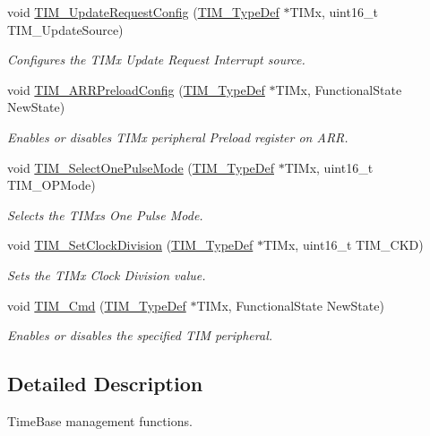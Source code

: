 \begin{DoxyCompactItemize}
void \hyperlink{group___t_i_m___group1_ga1d7a8f952e209de142499e67a653fc1f}{T\+I\+M\+\_\+\+Update\+Request\+Config} (\hyperlink{struct_t_i_m___type_def}{T\+I\+M\+\_\+\+Type\+Def} $\ast$T\+I\+Mx, uint16\+\_\+t T\+I\+M\+\_\+\+Update\+Source)
\begin{DoxyCompactList}\small\item\em Configures the T\+I\+Mx Update Request Interrupt source. \end{DoxyCompactList}\item 
void \hyperlink{group___t_i_m___group1_ga42b44b9fc2b0798d733720dd6bac1ac0}{T\+I\+M\+\_\+\+A\+R\+R\+Preload\+Config} (\hyperlink{struct_t_i_m___type_def}{T\+I\+M\+\_\+\+Type\+Def} $\ast$T\+I\+Mx, Functional\+State New\+State)
\begin{DoxyCompactList}\small\item\em Enables or disables T\+I\+Mx peripheral Preload register on A\+RR. \end{DoxyCompactList}\item 
void \hyperlink{group___t_i_m___group1_gadd2cca5fac6c1291dc4339098d5c9562}{T\+I\+M\+\_\+\+Select\+One\+Pulse\+Mode} (\hyperlink{struct_t_i_m___type_def}{T\+I\+M\+\_\+\+Type\+Def} $\ast$T\+I\+Mx, uint16\+\_\+t T\+I\+M\+\_\+\+O\+P\+Mode)
\begin{DoxyCompactList}\small\item\em Selects the T\+I\+Mx\textquotesingle{}s One Pulse Mode. \end{DoxyCompactList}\item 
void \hyperlink{group___t_i_m___group1_ga20ef804dc32c723662d11ee7da3baab2}{T\+I\+M\+\_\+\+Set\+Clock\+Division} (\hyperlink{struct_t_i_m___type_def}{T\+I\+M\+\_\+\+Type\+Def} $\ast$T\+I\+Mx, uint16\+\_\+t T\+I\+M\+\_\+\+C\+KD)
\begin{DoxyCompactList}\small\item\em Sets the T\+I\+Mx Clock Division value. \end{DoxyCompactList}\item 
void \hyperlink{group___t_i_m___group1_ga2bdc275bcbd2ce9d1ba632e6c89896b7}{T\+I\+M\+\_\+\+Cmd} (\hyperlink{struct_t_i_m___type_def}{T\+I\+M\+\_\+\+Type\+Def} $\ast$T\+I\+Mx, Functional\+State New\+State)
\begin{DoxyCompactList}\small\item\em Enables or disables the specified T\+IM peripheral. \end{DoxyCompactList}\end{DoxyCompactItemize}


\subsection{Detailed Description}
Time\+Base management functions. 


